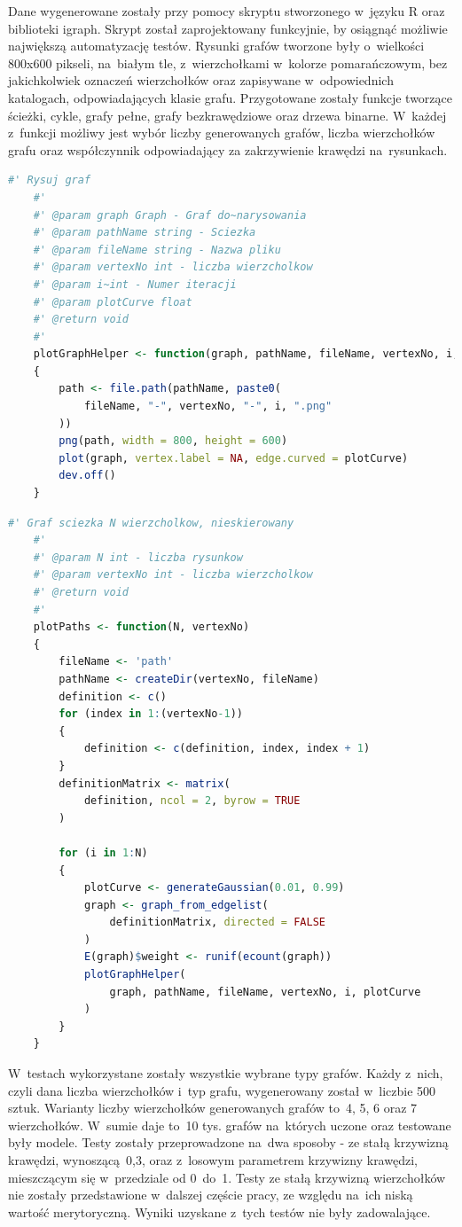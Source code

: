 Dane wygenerowane zostały przy pomocy skryptu stworzonego w~języku R oraz biblioteki igraph.
Skrypt został zaprojektowany funkcyjnie, by osiągnąć możliwie największą automatyzację testów.
Rysunki grafów tworzone były o~wielkości 800x600 pikseli, na~białym tle, z~wierzchołkami w~kolorze pomarańczowym,
bez jakichkolwiek oznaczeń wierzchołków oraz zapisywane w~odpowiednich katalogach, odpowiadających klasie grafu.
Przygotowane zostały funkcje tworzące ścieżki, cykle, grafy pełne, grafy bezkrawędziowe oraz drzewa binarne.
W~każdej z~funkcji możliwy jest wybór liczby generowanych grafów, liczba wierzchołków grafu
oraz współczynnik odpowiadający za zakrzywienie krawędzi na~rysunkach.

\begin{lstlisting}[language=R,caption=Listing skryptu rysującego grafy,label={tests-generation-1}]
	#' Rysuj graf
	#'
	#' @param graph Graph - Graf do~narysowania
	#' @param pathName string - Sciezka
	#' @param fileName string - Nazwa pliku
	#' @param vertexNo int - liczba wierzcholkow
	#' @param i~int - Numer iteracji
	#' @param plotCurve float
	#' @return void
	#'
	plotGraphHelper <- function(graph, pathName, fileName, vertexNo, i, plotCurve)
	{
		path <- file.path(pathName, paste0(
			fileName, "-", vertexNo, "-", i, ".png"
		))
		png(path, width = 800, height = 600)
		plot(graph, vertex.label = NA, edge.curved = plotCurve)
		dev.off()
	}	
\end{lstlisting}

\begin{lstlisting}[language=R,caption=Listing funkcji tworzącej ścieżkę,label={tests-generation-2}]
	#' Graf sciezka N wierzcholkow, nieskierowany
	#'
	#' @param N int - liczba rysunkow
	#' @param vertexNo int - liczba wierzcholkow
	#' @return void
	#'
	plotPaths <- function(N, vertexNo)
	{
		fileName <- 'path'
		pathName <- createDir(vertexNo, fileName)
		definition <- c()
		for (index in 1:(vertexNo-1))
		{
			definition <- c(definition, index, index + 1)
		}
		definitionMatrix <- matrix(
			definition, ncol = 2, byrow = TRUE
		)
		
		for (i in 1:N)
		{
			plotCurve <- generateGaussian(0.01, 0.99)
			graph <- graph_from_edgelist(
				definitionMatrix, directed = FALSE
			)
			E(graph)$weight <- runif(ecount(graph))
			plotGraphHelper(
				graph, pathName, fileName, vertexNo, i, plotCurve
			)
		}
	}
\end{lstlisting}

W~testach wykorzystane zostały wszystkie wybrane typy grafów.
Każdy z~nich, czyli dana liczba wierzchołków i~typ grafu, wygenerowany został w~liczbie 500 sztuk.
Warianty liczby wierzchołków generowanych grafów to~4, 5, 6 oraz 7 wierzchołków.
W~sumie daje to~10 tys. grafów na~których uczone oraz testowane były modele.
Testy zostały przeprowadzone na~dwa sposoby - ze stałą krzywizną krawędzi, wynoszącą~0,3,
oraz z~losowym parametrem krzywizny krawędzi, mieszczącym się w~przedziale od 0~do~1.
Testy ze stałą krzywizną wierzchołków nie zostały przedstawione w~dalszej częście pracy,
ze względu na~ich niską wartość merytoryczną. Wyniki uzyskane z~tych testów nie były zadowalające.

